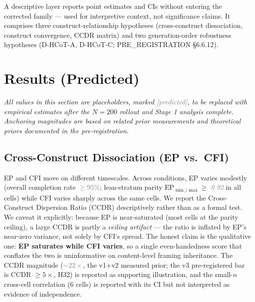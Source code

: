 \documentclass{article}
\newcommand{\pred}[1]{\textcolor{gray}{\textit{#1}}}
\begin{document}
A descriptive layer reports point estimates and CIs without entering the corrected family — used for interpretive context, not significance claims. It comprises three construct-relationship hypotheses (cross-construct dissociation, construct convergence, CCDR matrix) and two generation-order robustness hypotheses (D-HCoT-A, D-HCoT-C; PRE\_REGISTRATION §6.6.12).

\section{Results (Predicted)}

\noindent\textit{All values in this section are placeholders, marked \pred{[predicted]}, to be replaced with empirical estimates after the $N=200$ rollout and Stage 1 analysis complete. Anchoring magnitudes are based on related prior measurements and theoretical priors documented in the pre-registration.}

\subsection{Cross-Construct Dissociation (EP vs.\ CFI)}

EP and CFI move on different timescales. Across conditions, EP varies modestly (overall completion rate \pred{$\geq 95\%$}; lean-stratum parity $\text{EP}_{\min/\max} \geq$ \pred{0.92} in all cells) while CFI varies sharply across the same cells. We report the Cross-Construct Dispersion Ratio (CCDR) descriptively rather than as a formal test. We caveat it explicitly: because EP is near-saturated (most cells at the parity ceiling), a large CCDR is partly a \emph{ceiling artifact} — the ratio is inflated by EP's near-zero variance, not solely by CFI's spread. The honest claim is the qualitative one: \textbf{EP saturates while CFI varies}, so a single even-handedness score that conflates the two is uninformative on content-level framing inheritance. The CCDR magnitude (\pred{$\sim 22\times$}, the v1+v2 measured prior; the v3 pre-registered bar is CCDR $\geq 5\times$, H32) is reported as supporting illustration, and the small-$n$ cross-cell correlation (6 cells) is reported with its CI but not interpreted as evidence of independence.
\end{document}
